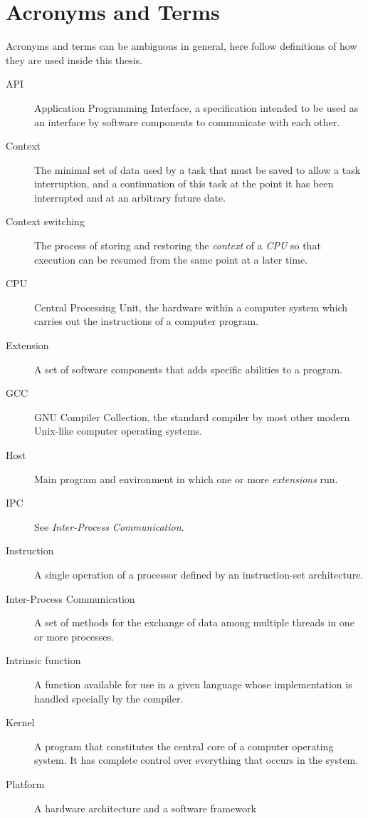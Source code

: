 \chapter {Acronyms and Terms} \label{appA}

Acronyms and terms can be ambiguous in general, here follow definitions of how
they are used inside this thesis.

\begin {description}
	\item [API] Application Programming Interface, a specification intended to
		be used as an interface by software components to communicate with each
		other.
	\item [Context] The minimal set of data used by a task that must be saved
		to allow a task interruption, and a continuation of this task at the
		point it has been interrupted and at an arbitrary future date.
	\item [Context switching] The process of storing and restoring the
		\emph{context} of a \emph{CPU} so that execution can be resumed from
		the same point at a later time.
	\item [CPU] Central Processing Unit, the hardware within a computer system
		which carries out the instructions of a computer program.
	\item [Extension] A set of software components that adds specific abilities
		to a program.
	\item [GCC] GNU Compiler Collection, the standard compiler by most other
		modern Unix-like computer operating systems.
	\item [Host] Main program and environment in which one or more
		\emph{extensions} run.
	\item [IPC] See \emph{Inter-Process Communication}.
	\item [Instruction] A single operation of a processor defined by an
		instruction-set architecture.
	\item [Inter-Process Communication] A set of methods for the exchange of
		data among multiple threads in one or more processes.
	\item [Intrinsic function] A function available for use in a given language
		whose implementation is handled specially by the compiler.
	\item [Kernel] A program that constitutes the central core of a computer
		operating system. It has complete control over everything that occurs
		in the system.
	\item [Platform] A hardware architecture and a software framework

\end{description}
